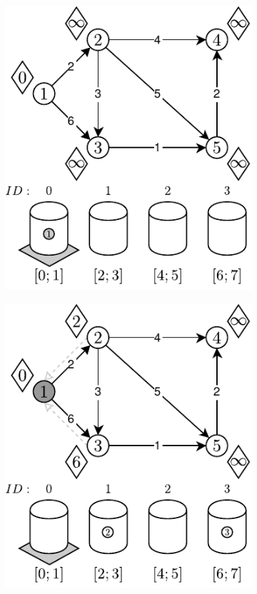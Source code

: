 \begin{figure}[!htbp]
	\centering
	\begin{subfigure}[b]{0.27\textwidth}
		\includegraphics[width=\textwidth]{Chapter_II/APROXIMATE-BUCKETS-Example/a.pdf}
		\caption{}
	\end{subfigure}%
	\begin{subfigure}[b]{0.27\textwidth}
		\includegraphics[width=\textwidth]{Chapter_II/APROXIMATE-BUCKETS-Example/b.pdf}

\end{subfigure}
\end{figure}
